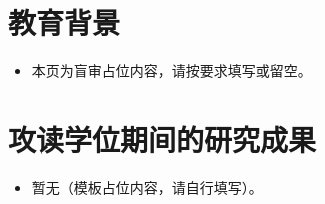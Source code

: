 
\section{教育背景}
\begin{itemize}
  \item 本页为盲审占位内容，请按要求填写或留空。
\end{itemize}

\section{攻读学位期间的研究成果}
\begin{itemize}
  \item 暂无（模板占位内容，请自行填写）。
\end{itemize}
